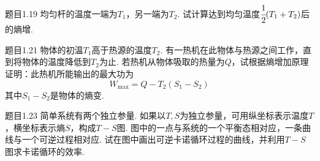 \begin{question}{题目1.19}
    均匀杆的温度一端为$T_1$，另一端为$T_2$. 试计算达到均匀温度$\cfrac12(T_1+T_2)$后的熵增.
\end{question}
\begin{solution}
\end{solution}


\begin{question}{题目1.21}
    物体的初温$T_1$高于热源的温度$T_2$. 有一热机在此物体与热源之间工作，直到将物体的温度降低到$T_2$为止. 若热机从物体吸取的热量为$Q$，试根据熵增加原理证明：此热机所能输出的最大功为
    $$
        W_{\max}=Q-T_2(S_1-S_2)
    $$
    其中$S_1-S_2$是物体的熵变.
\end{question}
\begin{solution}
\end{solution}


\begin{question}{题目1.23}
    简单系统有两个独立参量. 如果以$T,S$为独立参量，可用纵坐标表示温度$T$，横坐标表示熵$S$，构成$T-S$图. 图中的一点与系统的一个平衡态相对应，一条曲线与一个可逆过程相对应. 试在图中画出可逆卡诺循环过程的曲线，并利用$T-S$图求卡诺循环的效率.
\end{question}
\begin{solution}
\end{solution}